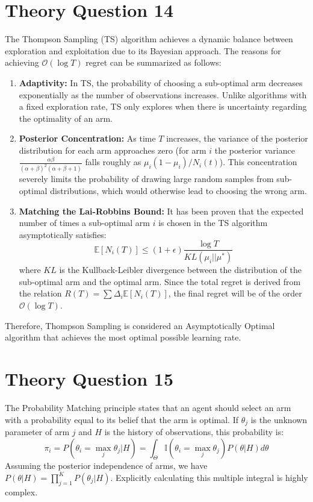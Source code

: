 \documentclass[12pt,a4paper]{article}
\begin{document}
\section*{Theory Question 14} %
The Thompson Sampling (TS) algorithm achieves a dynamic balance between exploration and exploitation due to its Bayesian approach.
The reasons for achieving $\mathcal{O}(\log T)$ regret can be summarized as follows: %
\begin{enumerate}
    \item \textbf{Adaptivity:} In TS, the probability of choosing a sub-optimal arm decreases exponentially as the number of observations increases.
Unlike algorithms with a fixed exploration rate, TS only explores when there is uncertainty regarding the optimality of an arm.
%
    \item \textbf{Posterior Concentration:} As time $T$ increases, the variance of the posterior distribution for each arm approaches zero (for arm $i$ the posterior variance $\frac{\alpha\beta}{(\alpha+\beta)^2(\alpha+\beta+1)}$ falls roughly as $\mu_i(1-\mu_i)/N_i(t)$).
This concentration severely limits the probability of drawing large random samples from sub-optimal distributions, which would otherwise lead to choosing the wrong arm.
%
    \item \textbf{Matching the Lai-Robbins Bound:} It has been proven that the expected number of times a sub-optimal arm $i$ is chosen in the TS algorithm asymptotically satisfies: %
    \[ 
    \mathbb{E}[N_i(T)] \leq (1+\epsilon)\frac{\log T}{KL(\mu_i || \mu^*)} 
    \] %
    where $KL$ is the Kullback-Leibler divergence between the distribution of the sub-optimal arm and the optimal arm.
Since the total regret is derived from the relation $R(T) = \sum \Delta_i \mathbb{E}[N_i(T)]$, the final regret will be of the order $\mathcal{O}(\log T)$.
%
\end{enumerate}
Therefore, Thompson Sampling is considered an Asymptotically Optimal algorithm that achieves the most optimal possible learning rate.
%

\section*{Theory Question 15} %
The Probability Matching principle states that an agent should select an arm with a probability equal to its belief that the arm is optimal.
If $\theta_j$ is the unknown parameter of arm $j$ and $H$ is the history of observations, this probability is: %
\[ 
\pi_i = P(\theta_i = \max_j \theta_j | H) = \int_{\Theta} \mathbb{I}(\theta_i = \max_j \theta_j) P(\theta | H) d\theta 
\] %
Assuming the posterior independence of arms, we have $P(\theta | H) = \prod_{j=1}^K P(\theta_j | H)$.
Explicitly calculating this multiple integral is highly complex. %
\end{document}
